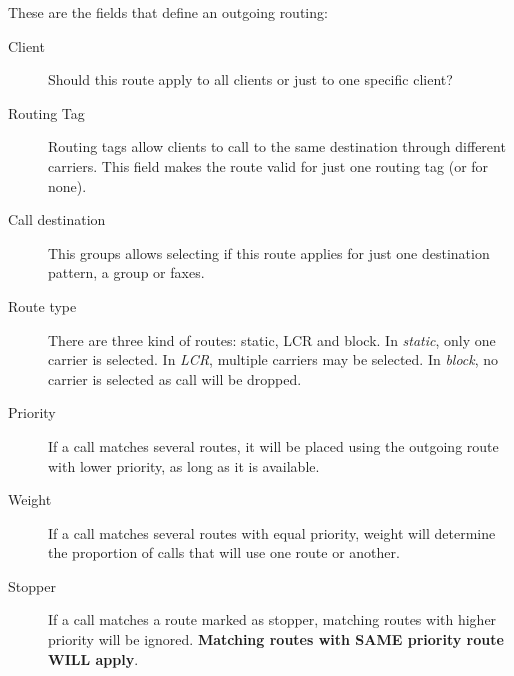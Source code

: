 \documentclass[letterpaper,10pt,english]{sphinxmanual}
\begin{document}
These are the fields that define an outgoing routing:
\begin{description}
\item[{Client}] \leavevmode{}\label{administration_portal/brand/routing/outgoing_routings:term-client}
Should this route apply to all clients or just to one specific client?

\item[{Routing Tag}] \leavevmode{}\label{administration_portal/brand/routing/outgoing_routings:term-routing-tag}
Routing tags allow clients to call to the same destination through different carriers. This field makes the
route valid for just one routing tag (or for none).

\item[{Call destination}] \leavevmode{}\label{administration_portal/brand/routing/outgoing_routings:term-call-destination}
This groups allows selecting if this route applies for just one destination pattern, a group or faxes.

\item[{Route type}] \leavevmode{}\label{administration_portal/brand/routing/outgoing_routings:term-route-type}
There are three kind of routes: static, LCR and block. In \emph{static}, only one carrier is selected. In \emph{LCR}, multiple carriers
may be selected. In \emph{block}, no carrier is selected as call will be dropped.

\item[{Priority}] \leavevmode{}\label{administration_portal/brand/routing/outgoing_routings:term-priority}
If a call matches several routes, it will be placed using the outgoing
route with lower priority, as long as it is available.

\item[{Weight}] \leavevmode{}\label{administration_portal/brand/routing/outgoing_routings:term-weight}
If a call matches several routes with equal priority, weight will determine
the proportion of calls that will use one route or another.

\item[{Stopper}] \leavevmode{}\label{administration_portal/brand/routing/outgoing_routings:term-stopper}
If a call matches a route marked as stopper, matching routes with higher priority
will be ignored. \textbf{Matching routes with SAME priority route WILL apply}.

\end{description}
\end{document}
